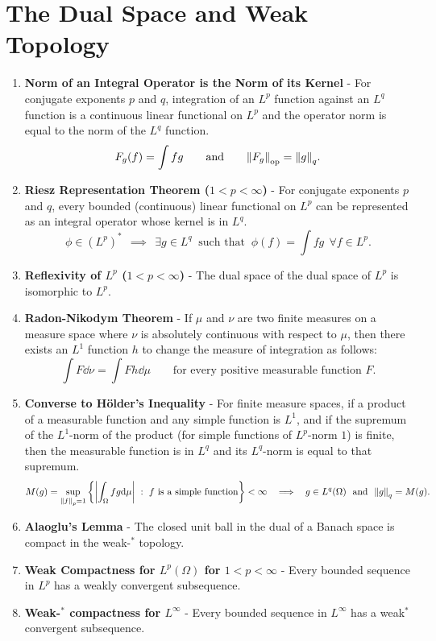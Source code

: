 \documentclass{article}
\begin{document}
    \section{The Dual Space and Weak Topology}
    \begin{enumerate}
        \item \textbf{Norm of an Integral Operator is the Norm of its Kernel} - For conjugate exponents $p$ and $q$, integration of an $L^p$ function against an $L^q$ function is a continuous linear functional on $L^p$ and the operator norm is equal to the norm of the $L^q$ function.  $$F_g(f) = \int fg \qquad \text{and} \qquad \norm{F_g}_\text{op} = \norm{g}_q.$$
        \item \textbf{Riesz Representation Theorem ($1 < p < \infty$)} - For conjugate exponents $p$ and $q$, every bounded (continuous) linear functional on $L^p$ can be represented as an integral operator whose kernel is in $L^q$.  $$\phi \in (L^p)^*\ \ \implies\ \ \exists g \in L^q\ \text{ such that }\ \phi(f) = \int f g\ \ \forall f \in L^p.$$
        \item \textbf{Reflexivity of $L^p$ ($1 < p < \infty$)} - The dual space of the dual space of $L^p$ is isomorphic to $L^p$.
        \item \textbf{Radon-Nikodym Theorem} - If $\mu$ and $\nu$ are two finite measures on a measure space where $\nu$ is absolutely continuous with respect to $\mu$, then there exists an $L^1$ function $h$ to change the measure of integration as follows: $$\int F \dd\nu = \int F h \dd\mu \qquad \text{for every positive measurable function } F.$$
        \item \textbf{Converse to H\"{o}lder's Inequality} - For finite measure spaces, if a product of a measurable function and any simple function is $L^1$, and if the supremum of the $L^1$-norm of the product (for simple functions of $L^p$-norm $1$) is finite, then the measurable function is in $L^q$ and its $L^q$-norm is equal to that supremum.  $$M(g) = \sup_{\norm{f}_p = 1} \left\{\abs{\int_\Omega fg \dd\mu}\ :\ f \text{ is a simple function}\right\} < \infty\ \ \implies\ \ g \in L^q(\Omega)\ \ \text{and}\ \ \norm{g}_q = M(g).$$
        \item \textbf{Alaoglu's Lemma} - The closed unit ball in the dual of a Banach space is compact in the weak-$^*$ topology.
        \item \textbf{Weak Compactness for $L^p(\Omega)$ for $1 < p < \infty$} - Every bounded sequence in $L^p$ has a weakly convergent subsequence.
        \item \textbf{Weak-$^*$ compactness for $L^\infty$} - Every bounded sequence in $L^\infty$ has a weak$^*$ convergent subsequence.

\end{enumerate}
\end{document}
